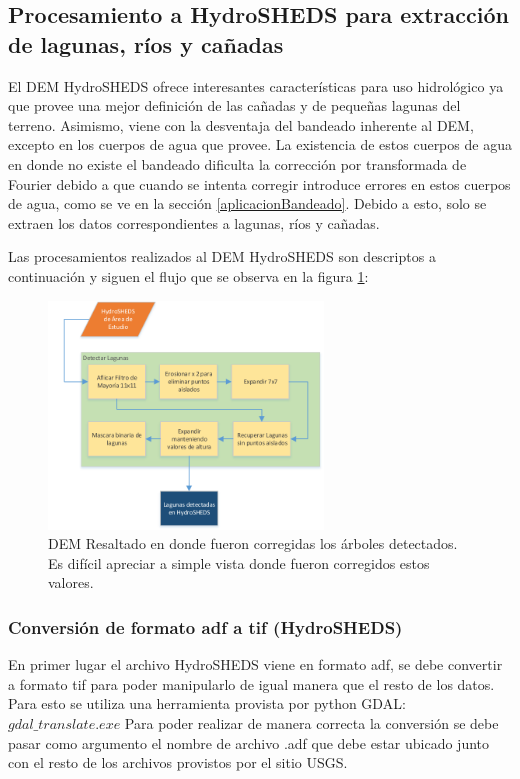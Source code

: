 \documentclass[10pt,a4paper, twoside]{report}
\begin{document}
\subsection{Procesamiento a HydroSHEDS para extracción de lagunas, ríos y cañadas}

El DEM HydroSHEDS ofrece interesantes características para uso hidrológico ya que provee una mejor definición de las cañadas y de pequeñas lagunas del terreno. Asimismo, viene con la desventaja del bandeado inherente al DEM, excepto en los cuerpos de agua que provee. La existencia de estos cuerpos de agua en donde no existe el bandeado dificulta la corrección por transformada de Fourier debido a que cuando se intenta corregir introduce errores en estos cuerpos de agua, como se ve en la sección \ref{aplicacionBandeado}. Debido a esto, solo se extraen los datos correspondientes a lagunas, ríos y cañadas.

Las procesamientos realizados al DEM HydroSHEDS son descriptos a continuación y siguen el flujo que se observa en la figura \ref{DiagramaLagunas}:

\begin{figure}[H]
   \centering      
   \includegraphics[width=0.65\textwidth]{imagenes/DiagramaLagunas.pdf}
 \caption{DEM Resaltado en donde fueron corregidas los árboles detectados. Es difícil apreciar a simple vista donde fueron corregidos estos valores.}
 \label{DiagramaLagunas}
\end{figure}

\subsubsection{Conversión de formato adf a tif (HydroSHEDS)}

En primer lugar el archivo HydroSHEDS viene en formato adf, se debe convertir a formato tif para poder manipularlo de igual manera que el resto de los datos. Para esto se utiliza una herramienta provista por python GDAL: $gdal\_translate.exe$
Para poder realizar de manera correcta la conversión se debe pasar como argumento el nombre de archivo .adf que debe estar ubicado junto con el resto de los archivos provistos por el sitio USGS.
\end{document}
